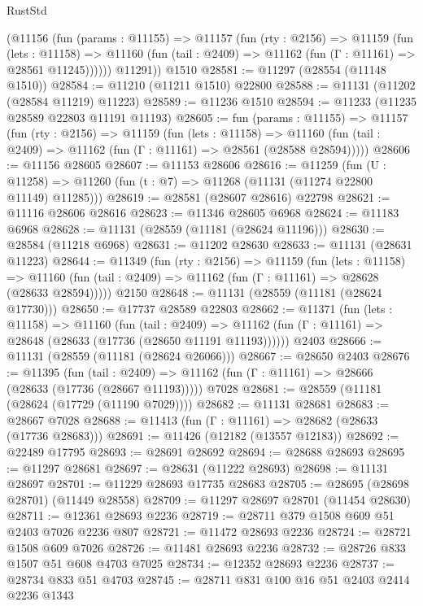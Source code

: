 \begin{lexlean}{RustStd}
\begin{coremodule}
        (@11156
          (fun (params : @11155) =>
          @11157
            (fun (rty : @2156) =>
            @11159
              (fun (lets : @11158) =>
              @11160 (fun (tail : @2409) => @11162 (fun (Γ : @11161) => @28561 @11245))))))
        @11291))
    @1510
@28581 := @11297 (@28554 (@11148 @1510))
@28584 := @11210 (@11211 @1510) @22800
@28588 := @11131 (@11202 (@28584 @11219) @11223)
@28589 := @11236 @1510
@28594 := @11233 (@11235 @28589 @22803 @11191 @11193)
@28605 := fun (params : @11155) =>
  @11157
    (fun (rty : @2156) =>
    @11159
      (fun (lets : @11158) =>
      @11160 (fun (tail : @2409) => @11162 (fun (Γ : @11161) => @28561 (@28588 @28594)))))
@28606 := @11156 @28605
@28607 := @11153 @28606
@28616 := @11259
    (fun (U : @11258) => @11260 (fun (t : @7) => @11268 (@11131 (@11274 @22800 @11149) @11285)))
@28619 := @28581 (@28607 @28616) @22798
@28621 := @11116 @28606 @28616
@28623 := @11346 @28605 @6968
@28624 := @11183 @6968
@28628 := @11131 (@28559 (@11181 (@28624 @11196)))
@28630 := @28584 (@11218 @6968)
@28631 := @11202 @28630
@28633 := @11131 (@28631 @11223)
@28644 := @11349
    (fun (rty : @2156) =>
    @11159
      (fun (lets : @11158) =>
      @11160 (fun (tail : @2409) => @11162 (fun (Γ : @11161) => @28628 (@28633 @28594)))))
    @2150
@28648 := @11131 (@28559 (@11181 (@28624 @17730)))
@28650 := @17737 @28589 @22803
@28662 := @11371
    (fun (lets : @11158) =>
    @11160
      (fun (tail : @2409) =>
      @11162 (fun (Γ : @11161) => @28648 (@28633 (@17736 (@28650 @11191 @11193))))))
    @2403
@28666 := @11131 (@28559 (@11181 (@28624 @26066)))
@28667 := @28650 @2403
@28676 := @11395
    (fun (tail : @2409) => @11162 (fun (Γ : @11161) => @28666 (@28633 (@17736 (@28667 @11193)))))
    @7028
@28681 := @28559 (@11181 (@28624 (@17729 (@11190 @7029))))
@28682 := @11131 @28681
@28683 := @28667 @7028
@28688 := @11413 (fun (Γ : @11161) => @28682 (@28633 (@17736 @28683)))
@28691 := @11426 (@12182 (@13557 @12183))
@28692 := @22489 @17795
@28693 := @28691 @28692
@28694 := @28688 @28693
@28695 := @11297 @28681
@28697 := @28631 (@11222 @28693)
@28698 := @11131 @28697
@28701 := @11229 @28693 @17735 @28683
@28705 := @28695 (@28698 @28701) (@11449 @28558)
@28709 := @11297 @28697 @28701 (@11454 @28630)
@28711 := @12361 @28693 @2236
@28719 := @28711 @379 @1508 @609 @51 @2403 @7026 @2236 @807
@28721 := @11472 @28693 @2236
@28724 := @28721 @1508 @609 @7026
@28726 := @11481 @28693 @2236
@28732 := @28726 @833 @1507 @51 @608 @4703 @7025
@28734 := @12352 @28693 @2236
@28737 := @28734 @833 @51 @4703
@28745 := @28711 @831 @100 @16 @51 @2403 @2414 @2236 @1343

\end{coremodule}
\end{lexlean}
